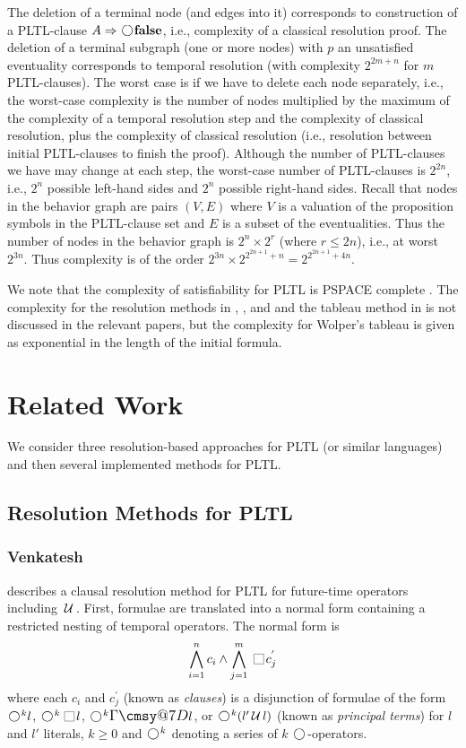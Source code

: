 \documentclass[nohyperref]{acmtrans2f}
\makeatletter
\def\sometime{\mathord{\hbox{\large$\mathchar"0\cmsy@7D$}}}
\newcommand{\always}{\raisebox{-.2ex}{
                           \mbox{\unitlength=0.9ex
                           \begin{picture}(2,2)
                           \linethickness{0.06ex}
                           \put(0,0){\line(1,0){2}}
                           \put(0,2){\line(1,0){2}}
                           \put(0,0){\line(0,1){2}}
                           \put(2,0){\line(0,1){2}}
                           \end{picture}}}
                          \,}
\newcommand{\next}{\!\raisebox{-.2ex}{ %
                        \mbox{\unitlength=0.9ex
                        \begin{picture}(2,2)
                        \linethickness{0.06ex}
                        \put(1,1){\circle{2}} %
                        \end{picture}}}       %
                        \,}
\def\until{\hbox{$\,\cal U \,$}}
\let\imp=\Rightarrow
\def\lfalse{\hbox{\rm\bf false}}
\makeatother
\begin{document}
The deletion of a terminal node (and edges into it) corresponds to construction of a
PLTL-clause $A \imp \next \lfalse$, i.e., complexity of a classical resolution proof.
The deletion of a terminal subgraph (one or more nodes) with $p$ an unsatisfied
eventuality corresponds to temporal resolution (with complexity $2^{2m+n}$
for $m$ PLTL-clauses).
The worst case is if we have to delete each node separately, i.e., the worst-case
complexity is 
the number of nodes multiplied by the maximum of the complexity of a temporal
resolution step  and the complexity of classical resolution,
plus the complexity of classical resolution (i.e., resolution between initial
PLTL-clauses to finish the proof). 
Although the number of PLTL-clauses we have may change at each step, the worst-case
number of PLTL-clauses is $2^{2n}$, i.e., $2^n$ possible left-hand sides and $2^n$
possible right-hand sides.
%
Recall that nodes in the behavior graph are pairs $(V,E)$ where $V$ is a
valuation of the proposition symbols in the PLTL-clause set and $E$ is a subset of the
eventualities. Thus the number of nodes in the behavior graph is
$2^n \times 2^r$ (where $r \leqslant 2n$), i.e., at worst $2^{3n}$. Thus complexity
is of the order $2^{3n} \times 2^{2^{2n+1}+n} = 2^{2^{2n+1}+4n}$.

We note that the complexity of satisfiability for PLTL is PSPACE complete
\cite{SC82}. The complexity for the resolution methods in
, , and  and the tableau
method in  is 
not discussed in the relevant papers, but the complexity 
for Wolper's tableau \cite{Wol83} is given as exponential in the length of
the initial formula.

\section{Related Work}
\label{related}
We consider three resolution-based approaches for PLTL (or similar
languages) and then several implemented methods for PLTL.

\subsection{Resolution Methods for PLTL}
\subsubsection{Venkatesh}
  describes a clausal resolution method for PLTL for 
future-time operators including $\until$. 
First, formulae are translated into a normal form containing a restricted
nesting of temporal 
operators. The normal form is 
$$
\bigwedge_{i=1}^{n} c_i \land \bigwedge_{j=1}^{m} \always c_j^{'}
$$
where each $c_i$ and $c_j^{'}$ (known as {\em clauses}) is a disjunction of
formulae of the form 
$\next^k l$, $\next^k \always l$, $\next^k \sometime l$, or $\next^k(l'
\until l)$ (known as {\em principal terms}) for $l$ and $l'$ literals, $k \geqslant
0$ and $\next^k$ denoting a series of $k$ 
$\next$-operators. 
\end{document}
